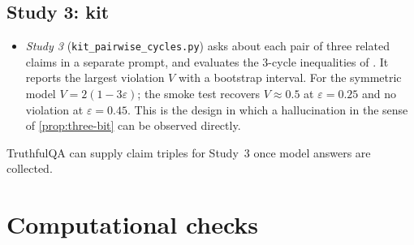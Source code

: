 \documentclass[11pt]{article}
\theoremstyle{definition}
\begin{document}
\subsection{Study 3: kit}
\begin{itemize}
\item \emph{Study 3} (\texttt{kit\_pairwise\_cycles.py}) asks about each pair of three related claims in a separate prompt, and
  evaluates the 3-cycle inequalities of \cite[Thm.~4.8]{Conditionals}. It reports the largest violation $V$ with a bootstrap interval.
  For the symmetric model $V=2(1-3\varepsilon)$; the smoke test recovers $V\approx0.5$ at $\varepsilon=0.25$ and no violation at
  $\varepsilon=0.45$. This is the design in which a hallucination in the sense of \cref{prop:three-bit} can be observed directly.
\end{itemize}
TruthfulQA \cite{Lin2022TruthfulQA} can supply claim triples for Study~3 once model answers are collected.

\FloatBarrier
\section{Computational checks}\label{sec:checks}
\end{document}
